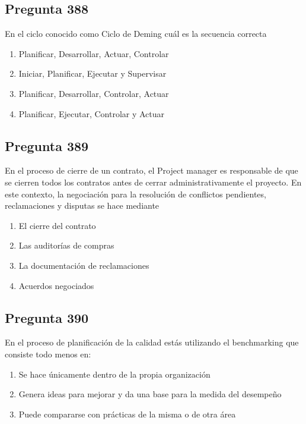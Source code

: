 \documentclass[11pt,a4paper]{article}
\begin{document}
\subsection*{Pregunta 388}
En el ciclo conocido como Ciclo de Deming cuál es la secuencia correcta

\begin{enumerate}[label=\alph*)]
  \item Planificar, Desarrollar, Actuar, Controlar
  \item Iniciar, Planificar, Ejecutar y Supervisar
  \item Planificar, Desarrollar, Controlar, Actuar
  \item Planificar, Ejecutar, Controlar y Actuar
\end{enumerate}

\subsection*{Pregunta 389}
En el proceso de cierre de un contrato, el Project manager es responsable de que se cierren todos los contratos antes de cerrar administrativamente el proyecto. En este contexto, la negociación para la resolución de conflictos pendientes, reclamaciones y disputas se hace mediante

\begin{enumerate}[label=\alph*)]
  \item El cierre del contrato
  \item Las auditorías de compras
  \item La documentación de reclamaciones
  \item Acuerdos negociados
\end{enumerate}

\subsection*{Pregunta 390}
En el proceso de planificación de la calidad estás utilizando el benchmarking que consiste todo menos en:

\begin{enumerate}[label=\alph*)]
  \item Se hace únicamente dentro de la propia organización
  \item Genera ideas para mejorar y da una base para la medida del desempeño
  \item Puede compararse con prácticas de la misma o de otra área
\end{enumerate}
\end{document}
